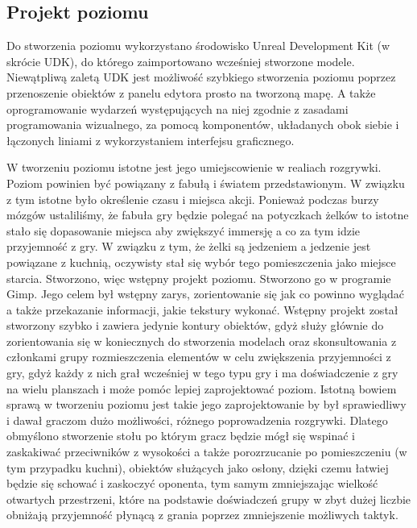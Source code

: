 \subsection{Projekt poziomu}

Do stworzenia poziomu wykorzystano środowisko Unreal Development Kit (w skrócie UDK), do którego zaimportowano wcześniej stworzone modele. Niewątpliwą zaletą UDK jest możliwość szybkiego stworzenia poziomu poprzez przenoszenie obiektów z panelu edytora prosto na tworzoną mapę. A także oprogramowanie wydarzeń występujących na niej zgodnie z zasadami programowania wizualnego, za pomocą komponentów, układanych obok siebie i łączonych liniami z wykorzystaniem interfejsu graficznego.

W tworzeniu poziomu istotne jest jego umiejscowienie w realiach rozgrywki. Poziom powinien być powiązany z fabułą i światem przedstawionym. W związku z tym istotne było określenie czasu i miejsca akcji. Ponieważ podczas burzy mózgów ustaliliśmy, że fabuła gry będzie polegać na potyczkach żelków to istotne stało się dopasowanie miejsca aby zwiększyć immersję a co za tym idzie przyjemność z gry. W związku z tym, że żelki są jedzeniem a jedzenie jest powiązane z kuchnią, oczywisty stał się wybór tego pomieszczenia jako miejsce starcia. Stworzono, więc wstępny projekt poziomu. Stworzono go w programie Gimp. Jego celem był wstępny zarys, zorientowanie się jak co powinno wyglądać a także przekazanie informacji, jakie tekstury wykonać. Wstępny projekt został stworzony szybko i zawiera jedynie kontury obiektów, gdyż służy głównie do zorientowania się w koniecznych do stworzenia modelach oraz skonsultowania z członkami grupy rozmieszczenia elementów w celu zwiększenia przyjemności z gry, gdyż każdy z nich grał wcześniej w tego typu gry i ma doświadczenie z gry na wielu planszach i może pomóc lepiej zaprojektować poziom. Istotną bowiem sprawą w tworzeniu poziomu jest takie jego zaprojektowanie by był sprawiedliwy i dawał graczom dużo możliwości, różnego poprowadzenia rozgrywki. Dlatego obmyślono stworzenie stołu po którym gracz będzie mógł się wspinać i zaskakiwać przeciwników z wysokości a także porozrzucanie po pomieszczeniu (w tym przypadku kuchni), obiektów służących jako osłony, dzięki czemu łatwiej będzie się schować i zaskoczyć oponenta, tym samym zmniejszając wielkość otwartych przestrzeni, które na podstawie doświadczeń grupy w zbyt dużej liczbie obniżają przyjemność płynącą z grania poprzez zmniejszenie możliwych taktyk.

